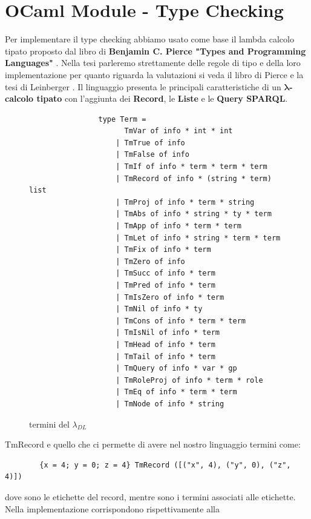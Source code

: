 \section{OCaml Module - Type Checking}\label{sec:Type Checking}
        Per implementare il type checking abbiamo usato come base il lambda calcolo tipato proposto dal libro di \textbf{Benjamin C. Pierce "Types and Programming Languages"} \cite{TypesAndProgrammingLanguages}.
        Nella tesi parleremo strettamente delle regole di tipo e della loro implementazione per quanto riguarda la valutazioni si veda il libro di Pierce e la tesi di Leinberger \cite{leinbergerphdthesis}.
        Il linguaggio presenta le principali caratteristiche di un \textbf{ $\boldsymbol{\lambda}$-calcolo tipato} con l'aggiunta dei \textbf{Record}, le \textbf{Liste} e le \textbf{Query SPARQL}.
        \begin{figure}[h] 
            \begin{verbatim}
                type Term =
                      TmVar of info * int * int 
                    | TmTrue of info 
                    | TmFalse of info 
                    | TmIf of info * term * term * term 
                    | TmRecord of info * (string * term) list 
                    | TmProj of info * term * string 
                    | TmAbs of info * string * ty * term 
                    | TmApp of info * term * term 
                    | TmLet of info * string * term * term 
                    | TmFix of info * term 
                    | TmZero of info 
                    | TmSucc of info * term 
                    | TmPred of info * term 
                    | TmIsZero of info * term 
                    | TmNil of info * ty 
                    | TmCons of info * term * term 
                    | TmIsNil of info * term 
                    | TmHead of info * term 
                    | TmTail of info * term  
                    | TmQuery of info * var * gp
                    | TmRoleProj of info * term * role
                    | TmEq of info * term * term
                    | TmNode of info * string
            \end{verbatim}
        \caption{termini del $\lambda_{DL}$}
        \end{figure}
        TmRecord e quello che ci permette di avere nel nostro linguaggio termini come:
        \begin{verbatim}
        {x = 4; y = 0; z = 4} TmRecord ([("x", 4), ("y", 0), ("z", 4)])
        \end{verbatim}
        dove  sono le etichette del record, mentre  sono i termini associati alle etichette. Nella implementazione corrispondono rispettivamente alla
